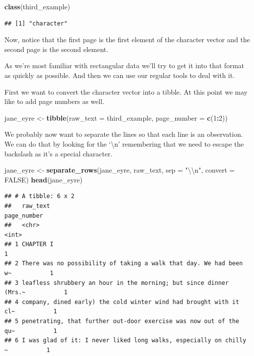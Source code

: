 \documentclass[
]{book}
\newenvironment{Shaded}{\begin{snugshade}}{\end{snugshade}}
\newcommand{\CharTok}[1]{\textcolor[rgb]{0.31,0.60,0.02}{#1}}
\newcommand{\DataTypeTok}[1]{\textcolor[rgb]{0.13,0.29,0.53}{#1}}
\newcommand{\DecValTok}[1]{\textcolor[rgb]{0.00,0.00,0.81}{#1}}
\newcommand{\KeywordTok}[1]{\textcolor[rgb]{0.13,0.29,0.53}{\textbf{#1}}}
\newcommand{\NormalTok}[1]{#1}
\newcommand{\OperatorTok}[1]{\textcolor[rgb]{0.81,0.36,0.00}{\textbf{#1}}}
\newcommand{\OtherTok}[1]{\textcolor[rgb]{0.56,0.35,0.01}{#1}}
\newcommand{\StringTok}[1]{\textcolor[rgb]{0.31,0.60,0.02}{#1}}
\begin{document}
\begin{Shaded}
\begin{Highlighting}[]
\KeywordTok{class}\NormalTok{(third_example)}
\end{Highlighting}
\end{Shaded}

\begin{verbatim}
## [1] "character"
\end{verbatim}

Now, notice that the first page is the first element of the character vector and the second page is the second element.

As we're most familiar with rectangular data we'll try to get it into that format as quickly as possible. And then we can use our regular tools to deal with it.

First we want to convert the character vector into a tibble. At this point we may like to add page numbers as well.

\begin{Shaded}
\begin{Highlighting}[]
\NormalTok{jane_eyre <-}\StringTok{ }\KeywordTok{tibble}\NormalTok{(}\DataTypeTok{raw_text =}\NormalTok{ third_example,}
                    \DataTypeTok{page_number =} \KeywordTok{c}\NormalTok{(}\DecValTok{1}\OperatorTok{:}\DecValTok{2}\NormalTok{))}
\end{Highlighting}
\end{Shaded}

We probably now want to separate the lines so that each line is an observation. We can do that by looking for the `\textbackslash n' remembering that we need to escape the backslash as it's a special character.

\begin{Shaded}
\begin{Highlighting}[]
\NormalTok{jane_eyre <-}\StringTok{ }\KeywordTok{separate_rows}\NormalTok{(jane_eyre, raw_text, }\DataTypeTok{sep =} \StringTok{"}\CharTok{\textbackslash{}\textbackslash{}}\StringTok{n"}\NormalTok{, }\DataTypeTok{convert =} \OtherTok{FALSE}\NormalTok{)}
\KeywordTok{head}\NormalTok{(jane_eyre)}
\end{Highlighting}
\end{Shaded}

\begin{verbatim}
## # A tibble: 6 x 2
##   raw_text                                                           page_number
##   <chr>                                                                    <int>
## 1 CHAPTER I                                                                    1
## 2 There was no possibility of taking a walk that day. We had been w~           1
## 3 leafless shrubbery an hour in the morning; but since dinner (Mrs.~           1
## 4 company, dined early) the cold winter wind had brought with it cl~           1
## 5 penetrating, that further out-door exercise was now out of the qu~           1
## 6 I was glad of it: I never liked long walks, especially on chilly ~           1
\end{verbatim}
\end{document}
